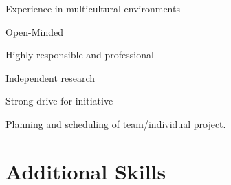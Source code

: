 {
Experience in multicultural environments

Open-Minded

Highly responsible and professional
}
{
Independent research

Strong drive for initiative

Planning and scheduling of team/individual project.
}

\section*{Additional Skills}



